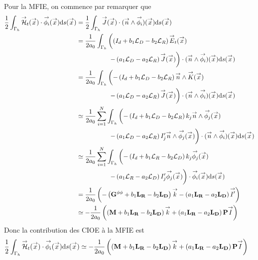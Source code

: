     Pour la MFIE, on commence par remarquer que
    \begin{equation*}
      \begin{aligned}
        \frac{1}{2}\int_{\Gamma_h} \vH_t(\vx) \cdot \phii(\vx) \dd{s}(\vx)
        &= \frac{1}{2}\int_{\Gamma_h} \vJ(\vx) \cdot (\vn \pvect \phii)(\vx) \dd{s}(\vx)
        \\
        &= \frac{1}{2a_0}\int_{\Gamma_h} \left( \left(I_d + b_1 \LD - b_2 \LR\right) \vE_t (\vx) \right.
        \\
        & \hspace{5em} \left.- \left(a_1 \LD - a_2 \LR\right) \vJ (\vx) \right) \cdot (\vn \pvect \phii)(\vx) \dd{s}(\vx)
        \\
        &= \frac{1}{2a_0}\int_{\Gamma_h} \left( -\left(I_d + b_1 \LD - b_2 \LR\right) \vn \pvect \vK (\vx) \right.
        \\
        & \hspace{5em} \left.- \left(a_1 \LD - a_2 \LR\right) \vJ (\vx) \right) \cdot (\vn \pvect \phii)(\vx) \dd{s}(\vx)
        \\
        & \simeq \frac{1}{2a_0}\sum_{i=1}^N \int_{\Gamma_h} \left( -\left(I_d + b_1 \LD - b_2 \LR\right) k_j \vn \pvect   \phij (\vx) \right.
        \\
        & \hspace{5em} \left. - \left(a_1 \LD - a_2 \LR\right) I_j' \vn \pvect \phij (\vx) \right) \cdot (\vn \pvect \phii)(\vx) \dd{s}(\vx)
        \\
        & \simeq \frac{1}{2a_0}\sum_{i=1}^N \int_{\Gamma_h} \left( -\left(I_d + b_1 \LR - b_2 \LD\right) k_j \phij (\vx) \right.
        \\
        & \hspace{5em} \left. - \left(a_1 \LR - a_2 \LD\right) I_j' \phij (\vx) \right) \cdot \phii(\vx) \dd{s}(\vx)
        \\
        & = \frac{1}{2a_0} \left( -\left(\mG{\phi}{\phi} + b_1 \mLR - b_2 \mLD\right) \vect{k}  - \left( a_1 \mLR - a_2 \mLD\right) \vect{I'}\right)
        \\
        & \simeq -\frac{1}{2a_0} \left( \left(\mM + b_1 \mLR - b_2 \mLD\right) \vect{k}  + \left( a_1 \mLR - a_2 \mLD\right) \mPP \vect{I} \right)
      \end{aligned}
    \end{equation*}
    Donc la contribution des CIOE à la MFIE est
    \begin{equation*}
      \begin{aligned}
        \frac{1}{2}\int_{\Gamma_h} \vH_t(\vx) \cdot \phii(\vx) \dd{s}(\vx)
        &\simeq -\frac{1}{2a_0} \left( \left(\mM + b_1 \mLR - b_2 \mLD\right) \vect{k}  + \left( a_1 \mLR - a_2 \mLD\right) \mPP \vect{I} \right)
      \end{aligned}
    \end{equation*}

